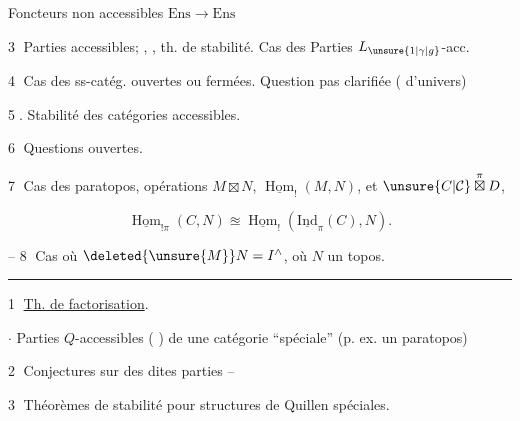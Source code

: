 Foncteurs non accessibles $\mathrm{Ens}\to\mathrm{Ens}$

\textcircled{3} Parties accessibles;  , , th. de stabilité.  Cas des Parties $L_{\unsure{1|\gamma|g}}$-acc. 

\textcircled{4}  Cas des ss-catég. ouvertes ou fermées. Question pas clarifiée ( d'univers)

\textcircled{5.} Stabilité des catégories accessibles.

\textcircled{6} Questions ouvertes.

\textcircled{7} Cas des paratopos, opérations $M\boxtimes N$, $\underline{\operatorname{Hom}}_!(M,N)$, et  $\unsure{C|\mathcal C}\mathbin{\overset{\pi}{\boxtimes}}D$,

\[\underline{\operatorname{Hom}}_{!\pi}(C,N)\approxeq\underline{\operatorname{Hom}}_!(\underline{\mathrm{Ind}}_\pi(C),N).\]

-- \textcircled{8}  Cas où $\deleted{\unsure{M}}N=I^\wedge$, où $N$ un topos.

\noindent\rule{.27\linewidth}{0.4pt}

\textcircled{1} \uline{Th. de factorisation}.

$\cdot$ Parties $Q$-accessibles ( ) de une  catégorie ``spéciale'' (p. ex. un paratopos)

\textcircled{2}  Conjectures sur  des dites parties --

\textcircled{3} Théorèmes de stabilité pour structures de Quillen spéciales.


